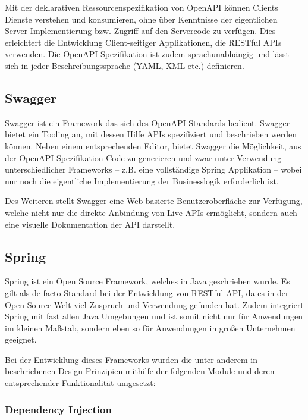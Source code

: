 			Mit der deklarativen Ressourcenspezifikation von OpenAPI können Clients Dienste verstehen und konsumieren, ohne über Kenntnisse der eigentlichen Server-Implementierung bzw. Zugriff auf den Servercode zu verfügen. Dies erleichtert die Entwicklung Client-seitiger Applikationen, die RESTful APIs verwenden. Die OpenAPI-Spezifikation ist zudem sprachunabhängig und lässt sich in jeder Beschreibungssprache (\ac{YAML}, \ac{XML} etc.) definieren. 
	
		\subsection{Swagger} %
		
			Swagger ist ein Framework das sich des OpenAPI Standards bedient. Swagger bietet ein Tooling an, mit dessen Hilfe APIs spezifiziert und beschrieben werden können. Neben einem entsprechenden Editor, bietet Swagger die Möglichkeit, aus der OpenAPI Spezifikation Code zu generieren und zwar unter Verwendung unterschiedlicher Frameworks -- z.B. eine vollständige Spring Applikation -- wobei nur noch die eigentliche Implementierung der Businesslogik erforderlich ist.
			
			Des Weiteren stellt Swagger eine Web-basierte Benutzeroberfläche zur Verfügung, welche nicht nur die direkte Anbindung von Live APIs ermöglicht, sondern auch eine visuelle Dokumentation der \ac{API} darstellt. \cite{SmartBear.2020}
	
		\subsection{Spring} %
		
			Spring ist ein Open Source Framework, welches in Java geschrieben wurde. Es gilt als de facto Standard bei der Entwicklung von RESTful API, da es in der Open Source Welt viel Zuspruch und Verwendung gefunden hat. Zudem integriert Spring mit fast allen Java Umgebungen und ist somit nicht nur für Anwendungen im kleinen Maßstab, sondern eben so für Anwendungen in großen Unternehmen geeignet. \cite{Walls.20162017} 
			
			Bei der Entwicklung dieses Frameworks wurden die unter anderem in \cite{Johnson.2003} beschriebenen Design Prinzipien mithilfe der folgenden Module und deren entsprechender Funktionalität umgesetzt:
			
			\subsubsection{Dependency Injection} %
			
